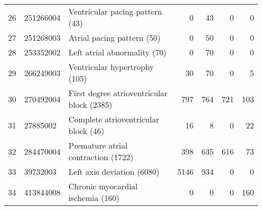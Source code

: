 \begin{tabular}{lllrrrr}
26 & 251266004 & Ventricular pacing pattern (43) & {\cellcolor[HTML]{EBF3ED}} \color[HTML]{000000} 0 & {\cellcolor[HTML]{2E8B57}} \color[HTML]{F1F1F1} 43 & {\cellcolor[HTML]{EBF3ED}} \color[HTML]{000000} 0 & {\cellcolor[HTML]{EBF3ED}} \color[HTML]{000000} 0 \\
27 & 251268003 & Atrial pacing pattern (50) & {\cellcolor[HTML]{EBF3ED}} \color[HTML]{000000} 0 & {\cellcolor[HTML]{2E8B57}} \color[HTML]{F1F1F1} 50 & {\cellcolor[HTML]{EBF3ED}} \color[HTML]{000000} 0 & {\cellcolor[HTML]{EBF3ED}} \color[HTML]{000000} 0 \\
28 & 253352002 & Left atrial abnormality (70) & {\cellcolor[HTML]{EBF3ED}} \color[HTML]{000000} 0 & {\cellcolor[HTML]{2E8B57}} \color[HTML]{F1F1F1} 70 & {\cellcolor[HTML]{EBF3ED}} \color[HTML]{000000} 0 & {\cellcolor[HTML]{EBF3ED}} \color[HTML]{000000} 0 \\
29 & 266249003 & Ventricular hypertrophy (105) & {\cellcolor[HTML]{9AC6AD}} \color[HTML]{000000} 30 & {\cellcolor[HTML]{2E8B57}} \color[HTML]{F1F1F1} 70 & {\cellcolor[HTML]{EBF3ED}} \color[HTML]{000000} 0 & {\cellcolor[HTML]{DEEBE3}} \color[HTML]{000000} 5 \\
30 & 270492004 & First degree atrioventricular block (2385) & {\cellcolor[HTML]{2E8B57}} \color[HTML]{F1F1F1} 797 & {\cellcolor[HTML]{37905E}} \color[HTML]{F1F1F1} 764 & {\cellcolor[HTML]{439667}} \color[HTML]{F1F1F1} 721 & {\cellcolor[HTML]{EBF3ED}} \color[HTML]{000000} 103 \\
31 & 27885002 & Complete atrioventricular block (46) & {\cellcolor[HTML]{61A780}} \color[HTML]{F1F1F1} 16 & {\cellcolor[HTML]{A6CDB6}} \color[HTML]{000000} 8 & {\cellcolor[HTML]{EBF3ED}} \color[HTML]{000000} 0 & {\cellcolor[HTML]{2E8B57}} \color[HTML]{F1F1F1} 22 \\
32 & 284470004 & Premature atrial contraction (1722) & {\cellcolor[HTML]{7DB696}} \color[HTML]{F1F1F1} 398 & {\cellcolor[HTML]{2E8B57}} \color[HTML]{F1F1F1} 635 & {\cellcolor[HTML]{348E5C}} \color[HTML]{F1F1F1} 616 & {\cellcolor[HTML]{EBF3ED}} \color[HTML]{000000} 73 \\
33 & 39732003 & Left axis deviation (6080) & {\cellcolor[HTML]{2E8B57}} \color[HTML]{F1F1F1} 5146 & {\cellcolor[HTML]{C9E0D2}} \color[HTML]{000000} 934 & {\cellcolor[HTML]{EBF3ED}} \color[HTML]{000000} 0 & {\cellcolor[HTML]{EBF3ED}} \color[HTML]{000000} 0 \\
34 & 413844008 & Chronic myocardial ischemia (160) & {\cellcolor[HTML]{EBF3ED}} \color[HTML]{000000} 0 & {\cellcolor[HTML]{EBF3ED}} \color[HTML]{000000} 0 & {\cellcolor[HTML]{EBF3ED}} \color[HTML]{000000} 0 & {\cellcolor[HTML]{2E8B57}} \color[HTML]{F1F1F1} 160 \\

\end{tabular}
